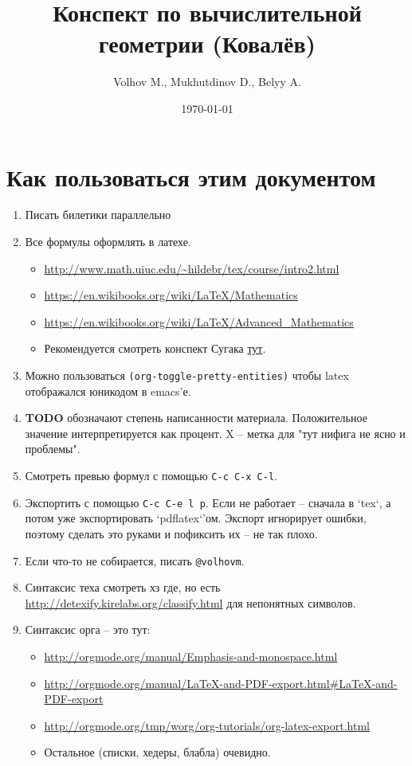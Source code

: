 \documentclass[11pt]{article}
\author{Volhov M., Mukhutdinov D., Belyy A.}
\date{\today}
\title{Конспект по вычислительной геометрии (Ковалёв)}
\begin{document}
\maketitle
\tableofcontents


\section{Как пользоваться этим документом}
\label{sec:orgheadline1}
\begin{enumerate}
\item Писать билетики параллельно
\item Все формулы оформлять в латехе.
\begin{itemize}
\item \url{http://www.math.uiuc.edu/~hildebr/tex/course/intro2.html}
\item \url{https://en.wikibooks.org/wiki/LaTeX/Mathematics}
\item \url{https://en.wikibooks.org/wiki/LaTeX/Advanced_Mathematics}
\item Рекомендуется смотреть конспект Сугака \href{https://github.com/sugakandrey/Functional-analysis/blob/master/hahnbanach.tex}{тут}.
\end{itemize}
\item Можно пользоваться \texttt{(org-toggle-pretty-entities)} чтобы latex
отображался юникодом в emacs'е.
\item \textbf{TODO} обозначают степень написанности материала. Положительное
значение интерпретируется как процент. X -- метка для "тут нифига
не ясно и проблемы".
\item Смотреть превью формул с помощью \texttt{C-c C-x C-l}.
\item Экспортить с помощью \texttt{C-c C-e l p}. Если не работает -- сначала в
`tex`, а потом уже экспортировать `pdflatex`'ом. Экспорт
игнорирует ошибки, поэтому сделать это руками и пофиксить их --
не так плохо.
\item Если что-то не собирается, писать \texttt{@volhovm}.
\item Синтаксис теха смотреть хз где, но есть
\url{http://detexify.kirelabs.org/classify.html} для непонятных
символов.
\item Синтаксис орга -- это тут:
\begin{itemize}
\item \url{http://orgmode.org/manual/Emphasis-and-monospace.html}
\item \url{http://orgmode.org/manual/LaTeX-and-PDF-export.html#LaTeX-and-PDF-export}
\item \url{http://orgmode.org/tmp/worg/org-tutorials/org-latex-export.html}
\item Остальное (списки, хедеры, блабла) очевидно.
\end{itemize}
\end{enumerate}
\end{document}
